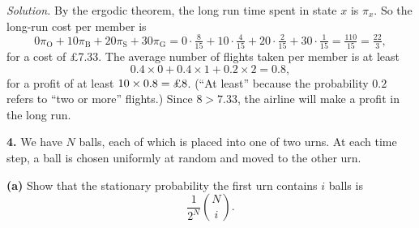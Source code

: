 \documentclass[
  a4paper,
]{article}
\theoremstyle{definition}
\theoremstyle{definition}
\theoremstyle{definition}
\theoremstyle{remark}
\begin{document}
\begin{myanswers}
\emph{Solution.}
By the ergodic theorem, the long run time spent in state \(x\) is \(\pi_x\). So the long-run cost per member is
\[ 0\pi_{\mathrm O} + 10\pi_{\mathrm B} + 20 \pi_{\mathrm S} + 30\pi_{\mathrm G}
    = 0 \cdot\tfrac8{15} + 10\cdot\tfrac{4}{15} + 20\cdot\tfrac{2}{15} + 30 \cdot \tfrac{1}{15} = \tfrac{110}{15} = \tfrac{22}{3} , \]
for a cost of \pounds 7.33.
The average number of flights taken per member is at least
\[ 0.4\times 0 + 0.4 \times 1 + 0.2\times 2 = 0.8 , \]
for a profit of at least \(10\times0.8 = \text{\pounds}8\). (``At least'' because the probability \(0.2\) refers to ``two or more'' flights.) Since \(8 >7.33\), the airline will make a profit in the long run.

\end{myanswers}

\textbf{4.} We have \(N\) balls, each of which is placed into one of two urns. At each time step, a ball is chosen uniformly at random and moved to the other urn.

\textbf{(a)} Show that the stationary probability the first urn contains \(i\) balls is
\[ \frac{1}{2^N} \binom{N}{i} . \]
\end{document}
